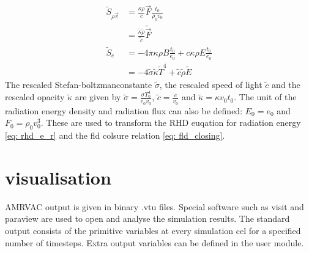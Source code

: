 \begin{align}
	\tilde{S}_{\rho \vec{v}} &=  \frac{\kappa \rho}{c} \vec{F} \frac{t_0}{\rho_0 v_0} \\
							 &=  \frac{\tilde{\kappa}\tilde{\rho}}{\tilde{c}} \tilde{\vec{F}} \\
	\tilde{S}_e &= -4\pi \kappa\rho B \frac{t_0}{e_0}  + c \kappa \rho E \frac{t_0}{e_0} \\
				&= -4 \tilde{\sigma} \tilde{\kappa} \tilde{T}^4 + \tilde{c} \tilde{\rho} \tilde{E}
\end{align}
The rescaled Stefan-boltzmanconstante $\tilde{\sigma}$, the rescaled speed of light $\tilde{c}$ and the rescaled opacity $\tilde{\kappa}$ are given by $\tilde{\sigma} = \frac{\sigma T_0^4}{e_0 v_0}$, $\tilde{c} = \frac{c}{v_0}$ and $\tilde{\kappa} = \kappa v_0 t_0$. The unit of the radiation energy density and radiation flux can also be defined: $E_0 = e_0$ and $F_0 = \rho_0 v_0^3$. These are used to transform the RHD euqation for radiation energy \eqref{eq: rhd_e_r} and the fld colsure relation \eqref{eq: fld_closing}. 

\section{visualisation}
AMRVAC output is given in binary .vtu files. Special software such as visit \cite{} and paraview are used to open and analyse the simulation results. The standard output consists of the primitive variables at every simulation cel for a specified number of timesteps. Extra output variables can be defined in the user module.

